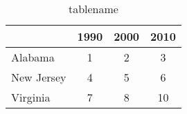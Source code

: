 \begin{table}[h!] 
\begin{center} 
\begin{tabular}{ l  c  c  c} \hline  
 & \textbf{ 1990 }  & \textbf{ 2000 }  & \textbf{ 2010 } \\ \hline  
 Alabama & 1  & 2  & 3 \\  
 New Jersey & 4  & 5  & 6 \\  
 Virginia & 7  & 8  & 10 \\  
\hline \hline  
\end{tabular}  
\end{center}  
\caption{ tablename } 
\label{ table } 
\end{table}  
